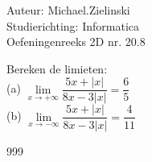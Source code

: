 \documentclass[a4paper]{article}
\begin{document}
  
\noindent \large Auteur: Michael.Zielinski \\
\noindent \large Studierichting: Informatica\\
\noindent \large Oefeningenreeks 2D nr. 20.8\\

\medskip

\normalsize

Bereken de limieten: \\

(a) $ \lim\limits_{x\to+\infty}\dfrac{5x+\left| x\right|}{8x-3\left| x\right|} = \dfrac{6}{5} $ \\

(b) $ \lim\limits_{x\to-\infty}\dfrac{5x+\left| x\right|}{8x-3\left| x\right|} = \dfrac{4}{11} $ \\

\begin{thebibliography}{999}
\end{thebibliography}
\end{document}

